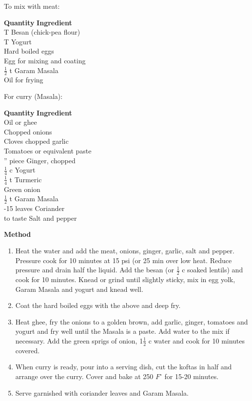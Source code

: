 To mix with meat:
\begin{tabbing}
\hspace{1.0cm}  \={\bf Quantity}   \hspace{3.0cm} \={\bf Ingredient}\\
 T 		\>Besan (chick-pea flour) \\
 T 		\>Yogurt\\
 		\>Hard boiled eggs          \\
 		\>Egg for mixing and coating\\
\>$\frac{1}{2}$ t \>Garam Masala         \\
\>		\>Oil for frying\\
\end{tabbing}

For curry (Masala):
\begin{tabbing}
\hspace{1.0cm}  \={\bf Quantity}   \hspace{3.0cm} \={\bf Ingredient}\\
\>		\>Oil or ghee\\
 		\>Chopped onions\\
 		\>Cloves chopped garlic\\
 		\>Tomatoes or equivalent paste\\
'' piece 	\>Ginger, chopped\\
\>$\frac{1}{4}$ c \>Yogurt\\
\>$\frac{1}{4}$ t \>Turmeric\\
\>		\>Green onion\\
\>$\frac{1}{2}$ t \>Garam Masala\\
-15 leaves	\>Coriander\\
\>to taste 	\>Salt and pepper\\
\end{tabbing}

{\bf Method}
\begin{enumerate}
\item Heat the water and add the meat, onions, ginger,  garlic,
salt and pepper.  Pressure cook for 10 minutes at 15 psi (or 25 min over
low heat.  Reduce pressure and drain half the liquid.  
Add the besan (or $\frac{1}{2}$ c soaked lentils) and
cook for 10 minutes. Knead or grind until slightly sticky, mix in egg yolk,
Garam Masala and yogurt and knead well.
\item  Coat the hard boiled eggs with the above and deep
fry.
\item Heat ghee, fry the onions to a golden brown, add garlic, ginger,
tomatoes and yogurt and fry well until the Masala is a paste.  Add
water to the mix if necessary.  Add the green sprigs of onion, 1$\frac{1}{2}$ c
water and cook for 10 minutes covered.
\item When curry is ready, pour into a serving dish, cut the koftas in
half and arrange over the curry.  Cover and bake at 250 $F^\circ$ for 15-20
minutes.
\item Serve garnished with coriander leaves and Garam Masala.
\end{enumerate}


